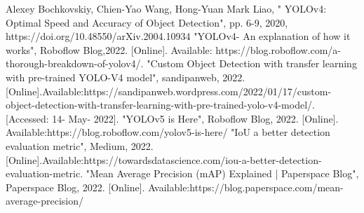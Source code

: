 \documentclass[12pt,a4paper,twoside,openright]{report}
\begin{document}
\begin{thebibliography}{00}
 Alexey Bochkovskiy, Chien-Yao Wang, Hong-Yuan Mark Liao, " YOLOv4: Optimal Speed and Accuracy of Object Detection", pp. 6-9, 2020, https://doi.org/10.48550/arXiv.2004.10934
 "YOLOv4- An explanation of how it works", Roboflow Blog,2022. [Online]. Available: https://blog.roboflow.com/a-thorough-breakdown-of-yolov4/.
 "Custom Object Detection with transfer learning with pre-trained YOLO-V4 model", sandipanweb, 2022. [Online].Available:https://sandipanweb.wordpress.com/2022/01/17/custom-object-detection-with-transfer-learning-with-pre-trained-yolo-v4-model/. [Accessed: 14- May- 2022].
 "YOLOv5 is Here", Roboflow Blog, 2022. [Online]. Available:https://blog.roboflow.com/yolov5-is-here/
 "IoU a better detection evaluation metric", Medium, 2022.[Online].Available:https://towardsdatascience.com/iou-a-better-detection-evaluation-metric.
 "Mean Average Precision (mAP) Explained | Paperspace Blog", Paperspace Blog, 2022. [Online]. Available:https://blog.paperspace.com/mean-average-precision/


\end{thebibliography}
\vspace{12pt}
\end{document}
